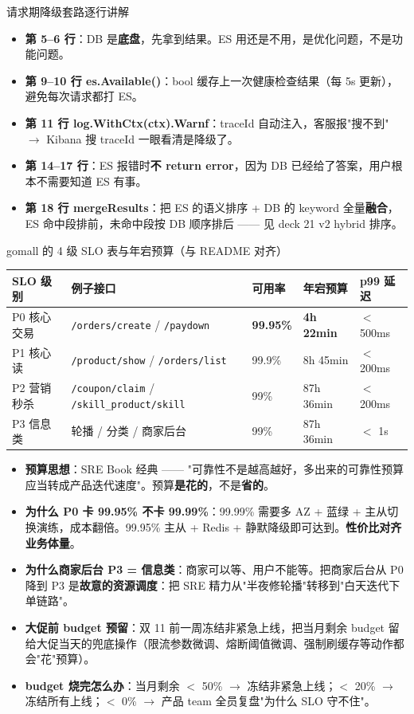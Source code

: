 \documentclass[aspectratio=169,11pt]{beamer}
\begin{document}
\begin{frame}[shrink]{请求期降级套路逐行讲解}
\begin{itemize}
  \item \textbf{第 5--6 行}：DB 是\textbf{底盘}，先拿到结果。ES 用还是不用，是优化问题，不是功能问题。
  \item \textbf{第 9--10 行 es.Available()}：bool 缓存上一次健康检查结果（每 5s 更新），避免每次请求都打 ES。
  \item \textbf{第 11 行 log.WithCtx(ctx).Warnf}：traceId 自动注入，客服报"搜不到" $\to$ Kibana 搜 traceId 一眼看清是降级了。
  \item \textbf{第 14--17 行}：ES 报错时\textbf{不 return error}，因为 DB 已经给了答案，用户根本不需要知道 ES 有事。
  \item \textbf{第 18 行 mergeResults}：把 ES 的语义排序 + DB 的 keyword 全量\textbf{融合}，ES 命中段排前，未命中段按 DB 顺序排后 —— 见 deck 21 v2 hybrid 排序。
\end{itemize}
\end{frame}

\begin{frame}[shrink]{gomall 的 4 级 SLO 表与年宕预算（与 README 对齐）}
\scriptsize
\begin{tabular}{@{}lllll@{}}
\toprule
SLO 级别 & 例子接口 & 可用率 & 年宕预算 & p99 延迟 \\
\midrule
P0 核心交易 & \texttt{/orders/create} / \texttt{/paydown} & \textbf{99.95\%} & \textbf{4h 22min} & $<$ 500ms \\
P1 核心读   & \texttt{/product/show} / \texttt{/orders/list}   & 99.9\%  & 8h 45min & $<$ 200ms \\
P2 营销秒杀 & \texttt{/coupon/claim} / \texttt{/skill\_product/skill} & 99\%    & 87h 36min & $<$ 200ms \\
P3 信息类   & 轮播 / 分类 / 商家后台 & 99\%    & 87h 36min & $<$ 1s \\
\bottomrule
\end{tabular}
\vspace{1mm}
\begin{itemize}
  \item \textbf{预算思想}：SRE Book 经典 —— "可靠性不是越高越好，多出来的可靠性预算应当转成产品迭代速度"。预算\textbf{是花的}，不是\textbf{省的}。
  \item \textbf{为什么 P0 卡 99.95\% 不卡 99.99\%}：99.99\% 需要多 AZ + 蓝绿 + 主从切换演练，成本翻倍。99.95\% 主从 + Redis + 静默降级即可达到。\textbf{性价比对齐业务体量}。
  \item \textbf{为什么商家后台 P3 = 信息类}：商家可以等、用户不能等。把商家后台从 P0 降到 P3 是\textbf{故意的资源调度}：把 SRE 精力从"半夜修轮播"转移到"白天迭代下单链路"。
  \item \textbf{大促前 budget 预留}：双 11 前一周冻结非紧急上线，把当月剩余 budget 留给大促当天的兜底操作（限流参数微调、熔断阈值微调、强制刷缓存等动作都会"花"预算）。
  \item \textbf{budget 烧完怎么办}：当月剩余 $<$ 50\% $\to$ 冻结非紧急上线；$<$ 20\% $\to$ 冻结所有上线；$<$ 0\% $\to$ 产品 team 全员复盘"为什么 SLO 守不住"。
\end{itemize}
\end{frame}
\end{document}
